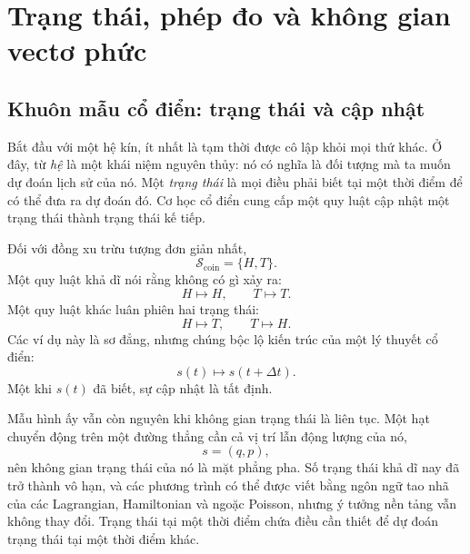 \chapter{Trạng thái, phép đo và không gian vectơ phức}


\section{Khuôn mẫu cổ điển: trạng thái và cập nhật}

Bắt đầu với một hệ kín, ít nhất là tạm thời được cô lập khỏi mọi thứ khác. Ở đây, từ \emph{hệ} là một khái niệm nguyên thủy: nó có nghĩa là đối tượng mà ta muốn dự đoán lịch sử của nó. Một \emph{trạng thái} là mọi điều phải biết tại một thời điểm để có thể đưa ra dự đoán đó. Cơ học cổ điển cung cấp một quy luật cập nhật một trạng thái thành trạng thái kế tiếp.

Đối với đồng xu trừu tượng đơn giản nhất,
\begin{equation}
  \mathcal S_{\mathrm{coin}}=\{H,T\}.
\end{equation}
Một quy luật khả dĩ nói rằng không có gì xảy ra:
\begin{equation}
  H\longmapsto H,
  \qquad
  T\longmapsto T.
\end{equation}
Một quy luật khác luân phiên hai trạng thái:
\begin{equation}
  H\longmapsto T,
  \qquad
  T\longmapsto H.
\end{equation}
Các ví dụ này là sơ đẳng, nhưng chúng bộc lộ kiến trúc của một lý thuyết cổ điển:
\begin{equation}
  s(t)\longmapsto s(t+\Delta t).
\end{equation}
Một khi \(s(t)\) đã biết, sự cập nhật là tất định.

Mẫu hình ấy vẫn còn nguyên khi không gian trạng thái là liên tục. Một hạt chuyển động trên một đường thẳng cần cả vị trí lẫn động lượng của nó,
\begin{equation}
  s=(q,p),
\end{equation}
nên không gian trạng thái của nó là mặt phẳng pha. Số trạng thái khả dĩ nay đã trở thành vô hạn, và các phương trình có thể được viết bằng ngôn ngữ tao nhã của các Lagrangian, Hamiltonian và ngoặc Poisson, nhưng ý tưởng nền tảng vẫn không thay đổi. Trạng thái tại một thời điểm chứa điều cần thiết để dự đoán trạng thái tại một thời điểm khác.

